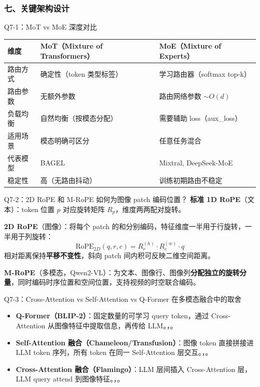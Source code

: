 \subsubsection{七、关键架构设计}

\begin{conceptbox}{Q7-1：MoT vs MoE 深度对比}
\begin{center}
\small
\begin{tabular}{|l|l|l|}
\hline
\textbf{维度} & \textbf{MoT（Mixture of Transformers）} & \textbf{MoE（Mixture of Experts）} \\
\hline
路由方式 & 确定性（token 类型标签） & 学习路由器（softmax top-k）\\
路由参数 & 无额外参数 & 路由网络参数 $\sim O(d)$ \\
负载均衡 & 自然均衡（按模态分配） & 需要辅助 loss（aux\_loss）\\
适用场景 & 模态明确可区分 & 任意任务混合 \\
代表模型 & BAGEL & Mixtral, DeepSeek-MoE \\
稳定性 & 高（无路由抖动） & 训练初期路由不稳定 \\
\hline
\end{tabular}
\end{center}
\end{conceptbox}

\begin{conceptbox}{Q7-2：2D RoPE 和 M-RoPE 如何为图像 patch 编码位置？}
\textbf{标准 1D RoPE}（文本）：token 位置 $p$ 对应旋转矩阵 $R_p$，维度两两配对旋转。

\textbf{2D RoPE}（图像）：将每个 patch 的和分别编码，特征维度一半用于行旋转，一半用于列旋转：
\[
\text{RoPE}_{2D}(q, r, c) = R_r^{(h)} \cdot R_c^{(w)} \cdot q
\]
相对距离保持\textbf{平移不变性}，斜向 patch 间内积可反映二维空间距离。

\textbf{M-RoPE}（多模态，Qwen2-VL）：为文本、图像行、图像列\textbf{分配独立的旋转分量}，同时编码时序位置和空间位置，支持视频的时空联合编码。
\end{conceptbox}

\begin{conceptbox}{Q7-3：Cross-Attention vs Self-Attention vs Q-Former 在多模态融合中的取舍}
\begin{itemize}
  \item \textbf{Q-Former（BLIP-2）}：固定数量的可学习 query token，通过 Cross-Attention 从图像特征中提取信息，再传给 LLM。，。
  \item \textbf{Self-Attention 融合（Chameleon/Transfusion）}：图像 token 直接拼接进 LLM token 序列，所有 token 在同一 Self-Attention 层交互。，。
  \item \textbf{Cross-Attention 融合（Flamingo）}：LLM 层间插入 Cross-Attention 层，LLM query attend 到图像特征。，。
\end{itemize}
\end{conceptbox}

